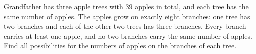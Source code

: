 Grandfather has three apple trees with $39$ apples in total, and each tree has the same number of apples. The apples grow on exactly eight branches: one tree has two branches and each of the other two trees has three branches. Every branch carries at least one apple, and no two branches carry the same number of apples. Find all possibilities for the numbers of apples on the branches of each tree.
